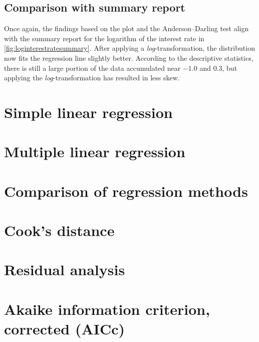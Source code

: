 \documentclass[12pt]{article}
\begin{document}
\subsection{Comparison with summary report}
Once again, the findings based on the plot and the Anderson--Darling test align with the summary report for the logarithm of the interest rate in \autoref{fig:loginterestratesummary}. After applying a \textit{log}-transformation, the distribution now fits the regression line slightly better. According to the descriptive statistics, there is still a large portion of the data accumulated near $-1.0$ and 0.3, but applying the \textit{log}-transformation has resulted in less skew.
\section{Simple linear regression}
\section{Multiple linear regression}
\section{Comparison of regression methods}
\section{Cook's distance}
\section{Residual analysis}
\section{Akaike information criterion, corrected (AICc)}
\end{document}
